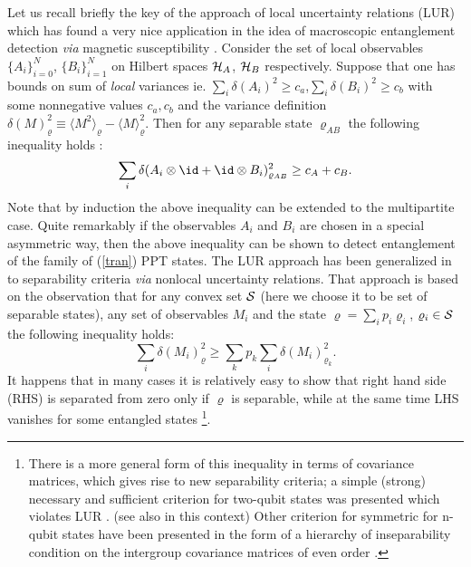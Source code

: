\documentclass[rmp,12pt,preprint]{revtex4-2}
\begin{document}
Let us recall briefly the key of the approach of local uncertainty
relations (LUR) \cite{HofmannT} which has found a very nice
application in the idea of macroscopic entanglement detection {\it
via} magnetic susceptibility \cite{WiesniakVB-Magnetic}. Consider the
set of local observables $\{ A_{i} \}_{i=0}^{N}$, $\{ B_{i}
\}_{i=1}^{N}$ on Hilbert spaces ${\cal H}_{A}$, ${\cal H}_{B}$
respectively. Suppose that one has bounds on sum of {\it local}
variances ie. $\sum_{i} \delta(A_{i})^{2}\geq c_{a}$,$\sum_{i}
\delta(B_{i})^{2}\geq c_{b}$ with some nonnegative values
$c_{a},c_{b}$ and the variance definition
$\delta(M)^{2}_{\varrho}\equiv \langle M^{2} \rangle_{\varrho} -
\langle M \rangle_{\varrho}^{2}$. Then for any separable state
$\varrho_{AB}$ the following inequality holds \cite{HofmannT}:
\begin{equation}
\sum_{i} \delta(A_{i}\otimes \id + \id \otimes
B_{i})_{\varrho_{AB}}^{2}\geq c_{A} + c_{B}.
\end{equation}
Note that by induction the above inequality can be extended to the
multipartite case. Quite remarkably if the observables $A_{i}$ and
$B_{i}$ are chosen in a special asymmetric way, then the above
inequality can be shown \cite{Hoffman2} to detect entanglement of
the family of (\ref{tran}) PPT states. The LUR  approach has been
generalized in \cite{OGuehne} to separability criteria {\it via}
nonlocal uncertainty relations. That approach is based on the
observation that for any convex set ${\cal S}$ (here we choose it to
be set of separable states), any set of observables $M_{i}$ and the
state $\varrho=\sum_{i}p_i\varrho_{i}$, $\varrho_{i}\in {\cal S}$
the following inequality holds:
\begin{equation}
\sum_i \delta(M_i)^{2}_{\varrho} \geq \sum_k p_k \sum_i
\delta(M_i)^{2}_{\varrho_{k}}.
\label{uncertaintyGuehne}
\end{equation}
It happens that in many cases it is relatively easy to show that right
hand side (RHS) is separated from zero only if $\varrho$ is separable,
while at the same time LHS vanishes for some entangled states
\footnote{There is a more general form of this inequality in terms of covariance matrices, which gives rise to new separability criteria;
a simple (strong) necessary and sufficient criterion for two-qubit states
was presented which violates LUR \cite {GuhneHGE2007}.
(see also \cite{AbascalBjork2007-lur-cov} in this context)
 Other criterion for symmetric for n-qubit states
have been presented in the form of a hierarchy of inseparability condition on the intergroup covariance matrices of even order \cite{DeviPR2007}.
}.
\end{document}
